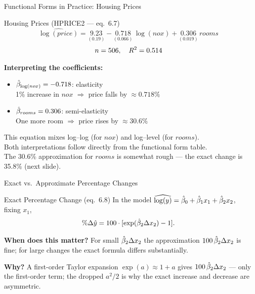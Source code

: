 \documentclass[aspectratio=169, 12pt]{beamer}
\begin{document}
\begin{frame}[shrink=8]{Functional Forms in Practice: Housing Prices}

  \begin{examplebox}{Housing Prices (HPRICE2 --- eq.\ 6.7)}
    \[
      \widehat{\log(price)} = \underset{(0.19)}{9.23}
        - \underset{(0.066)}{0.718}\, \log(nox)
        + \underset{(0.019)}{0.306}\, rooms
    \]
    \[
      n = 506, \quad R^2 = 0.514
    \]
  \end{examplebox}

  \medskip

      \textbf{Interpreting the coefficients:}
      \begin{itemize}
        \item $\hat{\beta}_{\log(nox)} = -0.718$: elasticity \\
              1\% increase in $nox$ $\Rightarrow$ price falls by $\approx 0.718\%$
        \item $\hat{\beta}_{rooms} = 0.306$: semi-elasticity \\
              One more room $\Rightarrow$ price rises by $\approx 30.6\%$
      \end{itemize}
  \medskip

      \begin{keybox}
        This equation mixes log--log (for $nox$) and log--level (for $rooms$). \\[4pt]
        Both interpretations follow directly from the functional form table. \\[4pt]
        The 30.6\% approximation for $rooms$ is somewhat rough ---
        the exact change is 35.8\% (next slide).
      \end{keybox}

\end{frame}

\begin{frame}{Exact vs.\ Approximate Percentage Changes}

  \begin{definitionbox}{Exact Percentage Change (eq.\ 6.8)}
    In the model $\widehat{\log(y)} = \hat{\beta}_0 + \hat{\beta}_1 x_1 + \hat{\beta}_2 x_2$, fixing $x_1$,
    \[
      \%\Delta\hat{y} = 100 \cdot [\exp(\hat{\beta}_2 \Delta x_2) - 1] .
    \]
  \end{definitionbox}

  \medskip

  \textbf{When does this matter?} For small $\hat{\beta}_2\Delta x_2$ the approximation
  $100\,\hat{\beta}_2\Delta x_2$ is fine; for large changes the exact formula differs
  substantially.

  \medskip

  \textbf{Why?} A first-order Taylor expansion $\exp(a)\approx 1+a$ gives
  $100\,\hat{\beta}_2\Delta x_2$ --- only the first-order term; the dropped $a^2/2$ is why the
  exact increase and decrease are asymmetric.

\end{frame}
\end{document}
